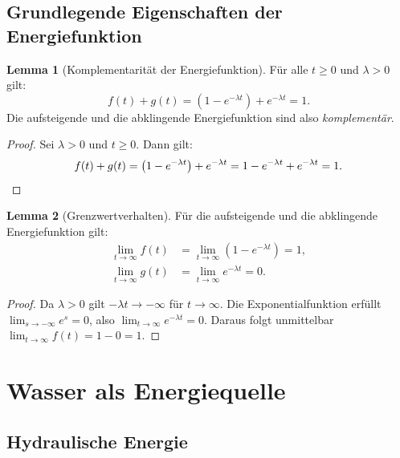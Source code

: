 ﻿\documentclass[a4paper,12pt]{article}
\theoremstyle{definition}
\newtheorem{lemma}{Lemma}
\begin{document}
\subsection{Grundlegende Eigenschaften der Energiefunktion}

\begin{lemma}[Komplementarit\"at der Energiefunktion]
\label{lem:komplement}
    F\"ur alle $t \geq 0$ und $\lambda > 0$ gilt:
    \[
        f(t) + g(t) = \left(1 - e^{-\lambda t}\right) + e^{-\lambda t} = 1.
    \]
    Die aufsteigende und die abklingende Energiefunktion sind also \emph{komplement\"ar}.
\end{lemma}

\begin{proof}
    Sei $\lambda > 0$ und $t \geq 0$. Dann gilt:
    \[
        f(t) + g(t) = \left(1 - e^{-\lambda t}\right) + e^{-\lambda t}
        = 1 - e^{-\lambda t} + e^{-\lambda t} = 1. \qedhere
    \]
\end{proof}

\begin{lemma}[Grenzwertverhalten]
\label{lem:grenzwert}
    F\"ur die aufsteigende und die abklingende Energiefunktion gilt:
    \begin{align*}
        \lim_{t \to \infty} f(t) &= \lim_{t \to \infty} \left(1 - e^{-\lambda t}\right) = 1,\\
        \lim_{t \to \infty} g(t) &= \lim_{t \to \infty} e^{-\lambda t} = 0.
    \end{align*}
\end{lemma}

\begin{proof}
    Da $\lambda > 0$ gilt $-\lambda t \to -\infty$ f\"ur $t \to \infty$.
    Die Exponentialfunktion erf\"ullt $\lim_{s \to -\infty} e^s = 0$, also
    $\lim_{t\to\infty} e^{-\lambda t} = 0$. Daraus folgt unmittelbar
    $\lim_{t\to\infty} f(t) = 1 - 0 = 1$. \qedhere
\end{proof}

\section{Wasser als Energiequelle}
\label{sec:wasser}

\subsection{Hydraulische Energie}
\end{document}

